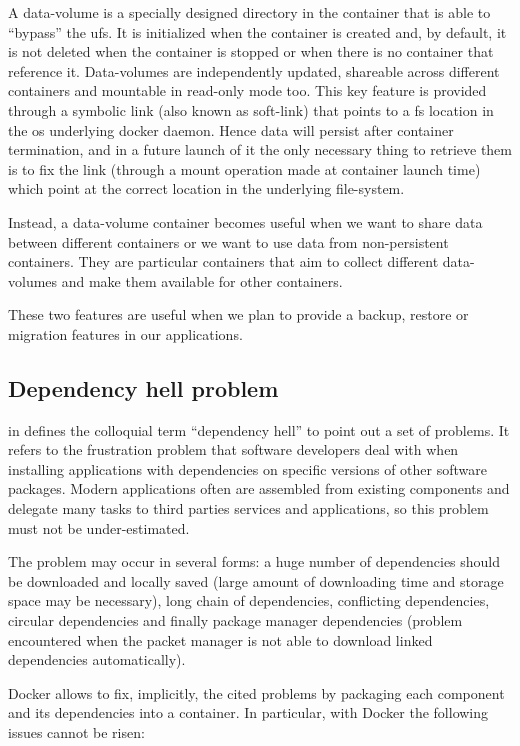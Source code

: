 A data-volume is a specially designed directory in the container that is able to “bypass” the \ac{ufs}.
It is initialized when the container is created and, by default, it is not deleted when the container
is stopped or when there is no container that reference it. Data-volumes are independently updated,
shareable across different containers and mountable in read-only mode too. This key feature is provided
through a symbolic link (also known as soft-link) that points to a \ac{fs} location in the \acs{os}
underlying docker daemon. Hence data will persist after container termination, and in a future launch
of it the only necessary thing to retrieve them is to fix the link (through a mount operation made at
container launch time) which point at the correct location in the underlying file-system.

Instead, a data-volume container becomes useful when we want to share data between different containers
or we want to use data from non-persistent containers. They are particular containers that aim to collect
different data-volumes and make them available for other containers.

These two features are useful when we plan to provide a backup, restore or migration features in our
applications.

\subsection{Dependency hell problem}
\label{sec:problemSpace-docker-dependencyHell}
\citeauthor{michaeljang2006} in \cite{michaeljang2006} defines the colloquial term “dependency hell” 
to point out a set of problems. It refers to the frustration problem that software developers deal with
when installing applications with dependencies on specific versions of other software packages. Modern
applications often are assembled from existing components and delegate many tasks to third parties services
and applications, so this problem must not be under-estimated.

The problem may occur in several forms: a huge number of dependencies should be downloaded and locally saved
(large amount of downloading time and storage space may be necessary), long chain of dependencies, conflicting 
dependencies, circular dependencies and finally package manager dependencies (problem encountered when 
the packet manager is not able to download linked dependencies automatically).

Docker allows to fix, implicitly, the cited problems by packaging each component and its dependencies
into a container. In particular, with Docker the following issues cannot be risen:

